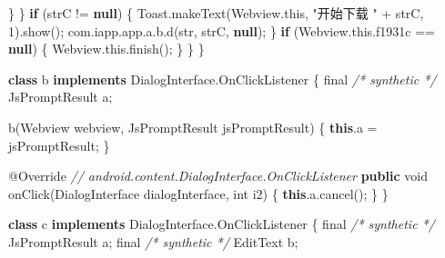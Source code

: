 \documentclass[
]{article}
\newenvironment{Shaded}{}{}
\newcommand{\AttributeTok}[1]{\textcolor[rgb]{0.49,0.56,0.16}{#1}}
\newcommand{\CommentTok}[1]{\textcolor[rgb]{0.38,0.63,0.69}{\textit{#1}}}
\newcommand{\ControlFlowTok}[1]{\textcolor[rgb]{0.00,0.44,0.13}{\textbf{#1}}}
\newcommand{\DataTypeTok}[1]{\textcolor[rgb]{0.56,0.13,0.00}{#1}}
\newcommand{\DecValTok}[1]{\textcolor[rgb]{0.25,0.63,0.44}{#1}}
\newcommand{\FunctionTok}[1]{\textcolor[rgb]{0.02,0.16,0.49}{#1}}
\newcommand{\KeywordTok}[1]{\textcolor[rgb]{0.00,0.44,0.13}{\textbf{#1}}}
\newcommand{\NormalTok}[1]{#1}
\newcommand{\OperatorTok}[1]{\textcolor[rgb]{0.40,0.40,0.40}{#1}}
\newcommand{\StringTok}[1]{\textcolor[rgb]{0.25,0.44,0.63}{#1}}
\begin{document}
\begin{Shaded}
\begin{Highlighting}[]
                \OperatorTok{\}}
            \OperatorTok{\}}
            \ControlFlowTok{if} \OperatorTok{(}\NormalTok{strC }\OperatorTok{!=} \KeywordTok{null}\OperatorTok{)} \OperatorTok{\{}
\NormalTok{                Toast}\OperatorTok{.}\FunctionTok{makeText}\OperatorTok{(}\NormalTok{Webview}\OperatorTok{.}\FunctionTok{this}\OperatorTok{,} \StringTok{"开始下载 "} \OperatorTok{+}\NormalTok{ strC}\OperatorTok{,} \DecValTok{1}\OperatorTok{).}\FunctionTok{show}\OperatorTok{();}
\NormalTok{                com}\OperatorTok{.}\FunctionTok{iapp}\OperatorTok{.}\FunctionTok{app}\OperatorTok{.}\FunctionTok{a}\OperatorTok{.}\FunctionTok{b}\OperatorTok{.}\FunctionTok{d}\OperatorTok{(}\NormalTok{str}\OperatorTok{,}\NormalTok{ strC}\OperatorTok{,} \KeywordTok{null}\OperatorTok{);}
            \OperatorTok{\}}
            \ControlFlowTok{if} \OperatorTok{(}\NormalTok{Webview}\OperatorTok{.}\FunctionTok{this}\OperatorTok{.}\FunctionTok{f1931c} \OperatorTok{==} \KeywordTok{null}\OperatorTok{)} \OperatorTok{\{}
\NormalTok{                Webview}\OperatorTok{.}\FunctionTok{this}\OperatorTok{.}\FunctionTok{finish}\OperatorTok{();}
            \OperatorTok{\}}
        \OperatorTok{\}}
    \OperatorTok{\}}

    \KeywordTok{class}\NormalTok{ b }\KeywordTok{implements}\NormalTok{ DialogInterface}\OperatorTok{.}\FunctionTok{OnClickListener} \OperatorTok{\{}
        \DataTypeTok{final} \CommentTok{/* synthetic */}\NormalTok{ JsPromptResult a}\OperatorTok{;}

        \FunctionTok{b}\OperatorTok{(}\NormalTok{Webview webview}\OperatorTok{,}\NormalTok{ JsPromptResult jsPromptResult}\OperatorTok{)} \OperatorTok{\{}
            \KeywordTok{this}\OperatorTok{.}\FunctionTok{a} \OperatorTok{=}\NormalTok{ jsPromptResult}\OperatorTok{;}
        \OperatorTok{\}}

        \AttributeTok{@Override} \CommentTok{// android.content.DialogInterface.OnClickListener}
        \KeywordTok{public} \DataTypeTok{void} \FunctionTok{onClick}\OperatorTok{(}\NormalTok{DialogInterface dialogInterface}\OperatorTok{,} \DataTypeTok{int}\NormalTok{ i2}\OperatorTok{)} \OperatorTok{\{}
            \KeywordTok{this}\OperatorTok{.}\FunctionTok{a}\OperatorTok{.}\FunctionTok{cancel}\OperatorTok{();}
        \OperatorTok{\}}
    \OperatorTok{\}}

    \KeywordTok{class}\NormalTok{ c }\KeywordTok{implements}\NormalTok{ DialogInterface}\OperatorTok{.}\FunctionTok{OnClickListener} \OperatorTok{\{}
        \DataTypeTok{final} \CommentTok{/* synthetic */}\NormalTok{ JsPromptResult a}\OperatorTok{;}
        \DataTypeTok{final} \CommentTok{/* synthetic */}\NormalTok{ EditText b}\OperatorTok{;}


\end{Highlighting}
\end{Shaded}
\end{document}
